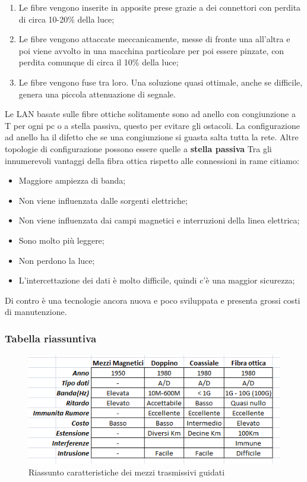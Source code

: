 \begin{enumerate}

\item{Le fibre vengono inserite in apposite prese grazie a dei connettori con perdita di circa 10-20\% della luce};
\item{Le fibre vengono attaccate meccanicamente, messe di fronte una all'altra e poi viene avvolto in una macchina particolare per poi essere pinzate, con perdita comunque di circa il 10\% della luce};
\item{Le fibre vengono fuse tra loro. Una soluzione quasi ottimale, anche se difficile, genera una piccola attenuazione di segnale}.

\end{enumerate}

Le LAN basate sulle fibre ottiche solitamente sono ad anello con congiunzione a T per ogni pc o a stella passiva, questo per evitare gli ostacoli. La configurazione ad anello ha il difetto che se una congiunzione si guasta salta tutta la rete. Altre topologie di configurazione possono essere quelle a \textbf{stella passiva}
\linebreak
\linebreak
Tra gli innumerevoli vantaggi della fibra ottica rispetto alle connessioni in rame citiamo:

\begin{itemize}

\item Maggiore ampiezza di banda;
\item Non viene influenzata dalle sorgenti elettriche;
\item Non viene influenzata dai campi magnetici e interruzioni della linea elettrica;
\item Sono molto più leggere;
\item Non perdono la luce;
\item L'intercettazione dei dati è molto difficile, quindi c'è una maggior sicurezza;

\end{itemize}

Di contro è una tecnologie ancora nuova e poco sviluppata e presenta grossi costi di manutenzione.

\subsubsection*{Tabella riassuntiva}

\begin{figure}[htpb]
\centering
\includegraphics[scale=1]{images/mezzi.png}
\caption{Riassunto caratteristiche dei mezzi trasmissivi guidati}
\end{figure}	

